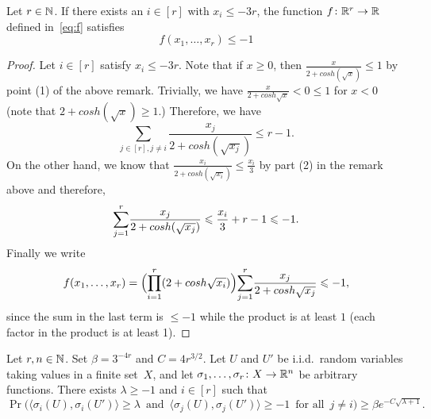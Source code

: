 \begin{lemma}
  \label{lem:special:function:2} %
  \leanok
  Let $r \in \mathbb{N}$. If there exists an $i \in [r]$ with $x_i \le - 3r$, the function $f \colon \mathbb{R}^r \rightarrow \mathbb{R}$ defined in~\eqref{eq:f} satisfies $$f(x_1,\dots,x_r) \le -1$$
\end{lemma}
%
\begin{proof}
  Let $i \in [r]$ satisfy $x_i \leq -3r$. Note that if $x\geq 0$, then $\frac{x}{2+cosh(\sqrt{x})}\leq 1$ by point (1) of the above remark.
  Trivially, we have $\frac{x}{2+cosh{\sqrt{x}}}<0\leq 1$ for $x<0$ (note that $2+cosh(\sqrt{x})\geq 1$.)
  Therefore, we have 
  \begin{equation*}
    \underset{j \in [r], j \neq i}{\sum} \frac{x_j}{2+cosh(\sqrt{x_j})} \leq r-1.
  \end{equation*}
  On the other hand, we know that $\frac{x_i}{2+cosh(\sqrt{x_i})} \leq \frac{x_i}{3}$ by part (2) in the remark above and therefore,
  \begin{equation*}
    \overunderset{r}{j=1}{\sum}\frac{x_j}{2+cosh(\sqrt{x_j})}\leq \frac{x_i}{3}+r-1\leq -1.
  \end{equation*}
  Finally we write 
  \begin{equation*}
    f(x_1,\dots,x_r) = \Bigl(\overunderset{r}{i=1}{\prod}(2+cosh\sqrt{x_i})\Bigr)\overunderset{r}{j=1}{\sum}\frac{x_j}{2+cosh \sqrt{x_j}} \leq -1,
  \end{equation*}
  since the sum in the last term is $\leq -1$ while the product is at least $1$ (each factor in the product is at least 1).
\end{proof}


\begin{lemma}
  \label{lem:geometric} %
  Let $r, n\in\mathbb{N}$. Set $\beta = 3^{-4r}$ and $C = 4r^{3/2}$.
  Let\/ $U$ and\/ $U'$ be i.i.d.~random variables taking values in a finite set~$X$, and let $\sigma_1,\ldots,\sigma_r \colon X \rightarrow \mathbb{R}^n$ be arbitrary functions. There exists $\lambda\ge-1$ and\/ $i\in[r]$ such that
  $$\Pr\Big( \big\langle \sigma_i(U),\sigma_i(U') \big\rangle \ge \lambda \, \text{ and } \, \big\langle \sigma_j(U), \sigma_j(U') \big\rangle \ge -1 \, \text{ for all } \, j \ne i \Big) \ge \beta e^{- C\sqrt{\lambda + 1}}.$$
\end{lemma}

